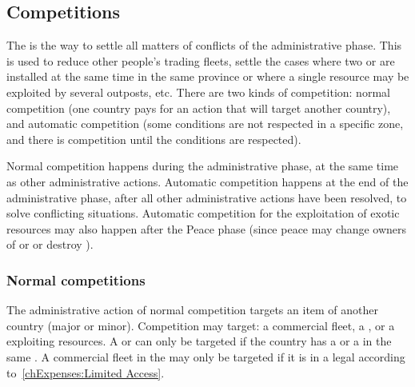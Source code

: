 \subsection{Competitions}\label{chExpenses:Competition}

\aparag The  is the way to settle all matters of
conflicts of the administrative phase. This is used to reduce other people's
trading fleets, settle the cases where two \TP or \COL are installed at the
same time in the same province or where a single resource may be exploited by
several outposts, etc. There are two kinds of competition: normal competition
(one country pays for an action that will target another country), and
automatic competition (some conditions are not respected in a specific zone,
and there is competition until the conditions are respected).

\aparag[Sequence] Normal competition happens during the administrative phase,
at the same time as other administrative actions. Automatic competition
happens at the end of the administrative phase, after all other administrative
actions have been resolved, to solve conflicting situations. Automatic
competition for the exploitation of exotic resources may also happen after the
Peace phase (since peace may change owners of \TP or \COL or destroy \TP).

\subsubsection{Normal competitions}
\aparag[Target] The administrative action of normal competition targets an
item of another country (major or minor).
\bparag Competition may target: a commercial fleet, a \TP, or a \COL
exploiting resources.
\bparag A \TP or \COL can only be targeted if the country has a \TP or a \COL
in the same \Area.
\bparag A commercial fleet in the \ROTW may only be targeted if it is in a
legal \STZ according to~\ref{chExpenses:Limited Access}.

